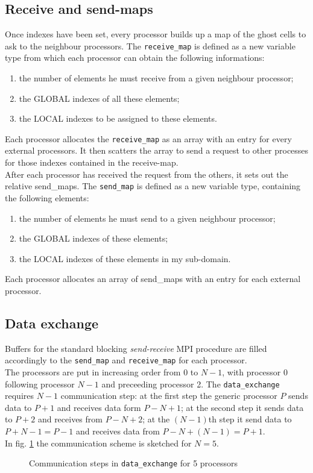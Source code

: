 \subsection{Receive and send-maps}
%
Once indexes have been set, every processor builds up a map of the ghost cells
to ask to the neighbour processors. The {\tt receive\_map} is 
defined as a new variable type from which each processor can obtain the following informations:
\begin{enumerate}
\item the number of elements he must receive from a given neighbour processor;
\item the GLOBAL indexes of all these elements;
\item the LOCAL indexes to be assigned to these elements.
\end{enumerate}
Each processor allocates the {\tt receive\_map} as an array with an entry for every 
external processors. It then scatters the array to send a request to other 
processes for those indexes contained in the receive-map.\\
After each processor has received the request from the others,
it sets out the relative send\_maps. The {\tt send\_map} is defined as a new variable
type, containing the following elements:
\begin{enumerate}
\item the number of elements he must send to a given neighbour processor;
\item the GLOBAL indexes of these elements;
\item the LOCAL indexes of these elements in my sub-domain.
\end{enumerate}
Each processor allocates an array of send\_maps with an entry for each external processor.
%
\subsection{Data exchange}
%
Buffers for the standard blocking {\em send-receive} MPI procedure are filled 
accordingly to the {\tt send\_map} and {\tt receive\_map} for each processor.\\
The processors are put in increasing order from 0 to $N-1$, with processor
0 following processor $N-1$ and preceeding processor 2. 
The {\tt data\_exchange} requires $N-1$ communication step: at the first step the generic 
processor $P$ sends data to $P+1$ and receives data form $P-N+1$;
at the second step it sends data to $P+2$ and receives from $P-N+2$; 
at the $(N-1)$th step it send data to $P+N-1=P-1$ and receives data from $P-N+(N-1)=P+1$.\\ 
In fig. \ref{fig:data-exchange} the communication scheme is sketched for $N=5$.\\
\begin{figure}[h]
\centerline{}
\caption{\label{fig:data-exchange} Communication steps in {\tt data\_exchange} for 5 processors}
\end{figure}
\par
%
